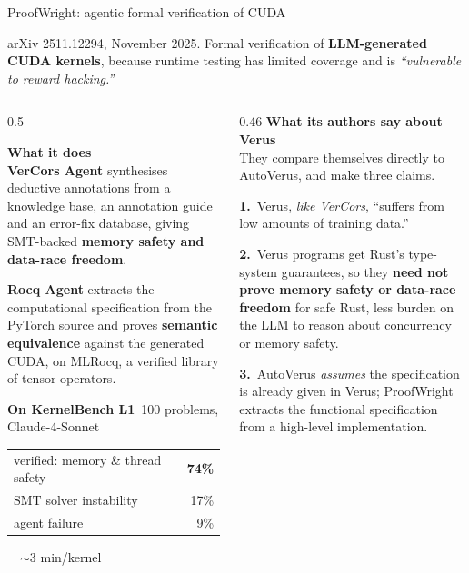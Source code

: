 \documentclass[aspectratio=169,10pt]{beamer}
\newcommand{\code}[1]{{\ttfamily #1}}
\newcommand{\hd}[1]{\textbf{\color{lgTeal}#1}}
\newcommand{\good}[1]{{\color{lgGreen}#1}}
\begin{document}
\begin{frame}{ProofWright: agentic formal verification of CUDA}

{\scriptsize
arXiv 2511.12294, November 2025. Formal verification of \textbf{LLM-generated CUDA kernels},
because runtime testing has limited coverage and is \emph{``vulnerable to reward hacking.''}
}

\vspace{6pt}
\begin{columns}[T]
\begin{column}{0.5\textwidth}
{\scriptsize
\hd{What it does}\\[2pt]
\textbf{VerCors Agent} synthesises deductive annotations from a knowledge base, an annotation
guide and an error-fix database, giving SMT-backed \textbf{memory safety and data-race freedom}.

\vspace{3pt}
\textbf{Rocq Agent} extracts the computational specification from the PyTorch source and
proves \textbf{semantic equivalence} against the generated CUDA, on \code{MLRocq}, a verified
library of tensor operators.

\vspace{5pt}
\hd{On KernelBench L1}\ {\color{lgGrey}100 problems, Claude-4-Sonnet}\\[3pt]
\begin{tabular}{lr}
\toprule
\good{verified}: memory \& thread safety & \good{\textbf{74\%}} \\
SMT solver instability & 17\% \\
agent failure & 9\% \\
\bottomrule
\end{tabular}\ \ {\color{lgGrey}$\sim$3 min/kernel}
}
\end{column}

\begin{column}{0.46\textwidth}
{\scriptsize
\hd{What its authors say about Verus}\\[2pt]
They compare themselves directly to AutoVerus, and make three claims.
}

\vspace{4pt}
\begin{callout}[lgTeal]
\scriptsize
\textbf{1.}\ Verus, \emph{like VerCors}, ``suffers from low amounts of training data.''

\vspace{3pt}
\textbf{2.}\ Verus programs get Rust's type-system guarantees, so they \textbf{need not prove
memory safety or data-race freedom} for safe Rust, less burden on the LLM to reason about
concurrency or memory safety.

\vspace{3pt}
\textbf{3.}\ AutoVerus \emph{assumes} the specification is already given in Verus; ProofWright
extracts the functional specification from a high-level implementation.
\end{callout}
\end{column}
\end{columns}

\end{frame}
\end{document}
